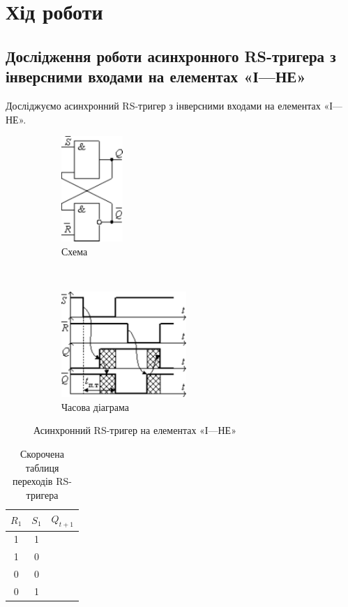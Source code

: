 \documentclass[a4paper,oneside,DIV=10,12pt]{scrartcl}
\begin{document}
	\section{Хід роботи}
		\subsection{Дослідження роботи асинхронного RS-тригера з інверсними входами на елементах «І—НЕ»}
			Досліджуємо асинхронний RS-тригер з інверсними входами на елементах «І—НЕ».
			
			\begin{figure}[!htbp]
			\centering
				\begin{subfigure}[t]{0.45\textwidth}
				\centering
				\vspace{0pt}
					\includegraphics[height=40mm]{assets/03-pdf/flipflop-rs-and-not-schematic.pdf}
				\caption{Схема}
				\label{fig:flipflop-rs-and-not-schematic}
				\end{subfigure}
				~
				\begin{subfigure}[t]{0.45\textwidth}
				\centering
				\vspace{0pt}
					\includegraphics[height=40mm]{assets/03-pdf/flipflop-rs-time-diagram.pdf}
				\caption{Часова діаграма}
				\label{fig:flipflop-rs-time-diagram}
				\end{subfigure}
			\caption{Асинхронний RS-тригер на елементах «І—НЕ»}
			\label{fig:flipflop-rs-and-not}
			\end{figure}
			
			\begin{table}[!htbp]
			\centering
				\begin{tabular}{ccc}
					\toprule
						$R_1$ & $S_1$ & $Q_{t+1}$\\
					\midrule
						1     & 1     & \\
						1     & 0     & \\
						0     & 0     & \\
						0     & 1     & \\
					\bottomrule
				\end{tabular}
			\caption{Скорочена таблиця переходів RS-тригера}
			\label{tab:flipflop-rs-excitation-table}
			\end{table}
			
\end{document}
